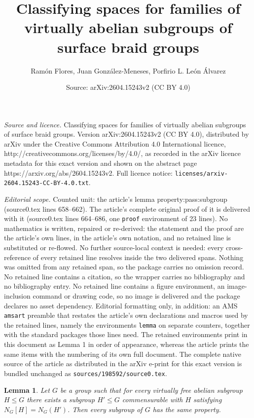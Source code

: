 \documentclass[10pt,a4paper]{amsart}
\title{Classifying spaces for families of virtually abelian subgroups of surface braid groups}
\author{Ramón Flores, Juan González-Meneses, Porfirio L. León Álvarez}
\date{Source: arXiv:2604.15243v2 (CC BY 4.0)}
\newtheorem{lemma}{Lemma}
\begin{document}
\maketitle

\noindent\emph{Source and licence.} Classifying spaces for families of virtually abelian subgroups of surface braid groups. Version arXiv:2604.15243v2 (CC BY 4.0), distributed by arXiv under the Creative Commons Attribution 4.0 International licence, http://creativecommons.org/licenses/by/4.0/, as recorded in the arXiv licence metadata for this exact version and shown on the abstract page https://arxiv.org/abs/2604.15243v2. Full licence notice: \texttt{licenses/arxiv-2604.15243-CC-BY-4.0.txt}.\par\smallskip

\noindent\textit{Editorial scope.} Counted unit: the article's lemma property:pass:subgroup (source0.tex lines 658--662). The article's complete original proof of it is delivered with it (source0.tex lines 664--686, one \texttt{proof} environment of 23 lines). No mathematics is written, repaired or re-derived: the statement and the proof are the article's own lines, in the article's own notation, and no retained line is substituted or re-flowed.  No further source-local context is needed: every cross-reference of every retained line resolves inside the two delivered spans.  Nothing was omitted from any retained span, so the package carries no omission record.  No retained line contains a citation, so the wrapper carries no bibliography and no bibliography entry.  No retained line contains a figure environment, an image-inclusion command or drawing code, so no image is delivered and the package declares no asset dependency.  Editorial formatting only, in addition: an AMS \texttt{amsart} preamble that restates the article's own declarations and macros used by the retained lines, namely the environments \texttt{lemma} on separate counters, together with the standard packages those lines need.  The retained environments print in this document as Lemma 1 in order of appearance, whereas the article prints the same items with the numbering of its own full document.  The complete native source of the article as distributed in the arXiv e-print for this exact version is bundled unchanged as \texttt{sources/198592/source0.tex}.
\begin{lemma}\label{property:pass:subgroup}
Let $G$ be a group such that for every virtually free abelian subgroup $H \leq G$
there exists a subgroup $H' \leq G$ commensurable with $H$ satisfying
$N_G[H] = N_G(H')$. Then every subgroup of $G$ has the same property.
\end{lemma}
\end{document}
